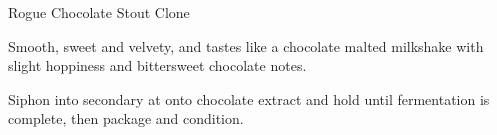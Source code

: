 \stylesection{\styleamericanstout}

\begin{recipe}{Rogue Chocolate Stout Clone}

\begin{aboutblock}
Smooth, sweet and velvety, and tastes like a chocolate malted milkshake with
slight hoppiness and bittersweet chocolate notes. 
\end{aboutblock}


\begin{methodandtiming}
 
\begin{mashsteps}
\end{mashsteps}

\begin{fermentationsteps}
\end{fermentationsteps}

\begin{directions}
Siphon into secondary at  onto chocolate extract and hold until
fermentation is complete, then package and condition.
\end{directions}

\end{methodandtiming}

\recipebreak

\begin{ingredientsblock}

\begin{malts}
\end{malts}

\begin{hops}
\end{hops}


\begin{twists}
\end{twists}

\end{ingredientsblock}

\end{recipe}

